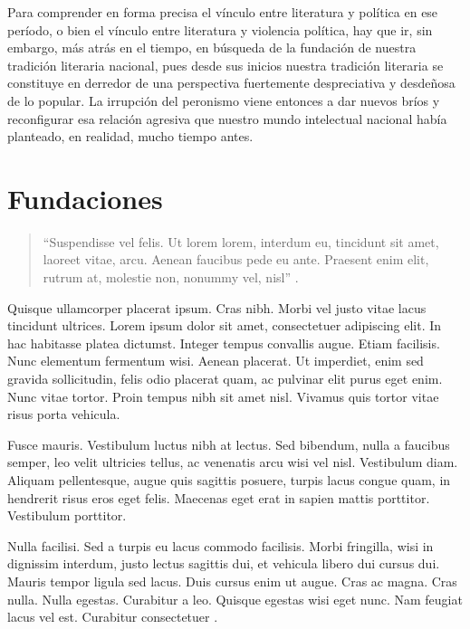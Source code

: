 Para comprender en forma precisa el vínculo entre literatura y política en ese período, o bien el vínculo entre literatura y violencia política, hay que ir, sin embargo, más atrás en el tiempo, en búsqueda de la fundación de nuestra tradición literaria nacional, pues desde sus inicios nuestra tradición literaria se constituye en derredor de una perspectiva fuertemente despreciativa y desdeñosa de lo popular. La irrupción del peronismo viene entonces a dar nuevos bríos y reconfigurar esa relación agresiva que nuestro mundo intelectual nacional había planteado, en realidad, mucho tiempo antes.

\mainmatter

\chapter{Fundaciones}

\begin{quote}
	\enquote{Suspendisse vel felis. Ut lorem lorem, interdum eu, tincidunt sit amet, laoreet vitae, arcu. Aenean faucibus pede eu ante. Praesent enim elit, rutrum at, molestie non, nonummy vel, nisl} \parencite{@3188-SHELLY2023}.
\end{quote}

Quisque ullamcorper placerat ipsum. Cras nibh. Morbi vel justo vitae lacus tincidunt ultrices. Lorem ipsum dolor sit amet, consectetuer adipiscing elit. In hac habitasse platea dictumst. Integer tempus convallis augue. Etiam facilisis. Nunc elementum fermentum wisi. Aenean placerat. Ut imperdiet, enim sed gravida sollicitudin, felis odio placerat quam, ac pulvinar elit purus eget enim. Nunc vitae tortor. Proin tempus nibh sit amet nisl. Vivamus quis tortor vitae risus porta vehicula.

Fusce mauris. Vestibulum luctus nibh at lectus. Sed bibendum, nulla a faucibus semper, leo velit ultricies tellus, ac venenatis arcu wisi vel nisl. Vestibulum diam. Aliquam pellentesque, augue quis sagittis posuere, turpis lacus congue quam, in hendrerit risus eros eget felis. Maecenas eget erat in sapien mattis porttitor. Vestibulum porttitor.

Nulla facilisi. Sed a turpis eu lacus commodo facilisis. Morbi fringilla, wisi in dignissim interdum, justo lectus sagittis dui, et vehicula libero dui cursus dui. Mauris tempor ligula sed lacus. Duis cursus enim ut augue. Cras ac magna. Cras nulla. Nulla egestas. Curabitur a leo. Quisque egestas wisi eget nunc. Nam feugiat lacus vel est. Curabitur consectetuer \parencite{@3190-QUIROGA2016}.


